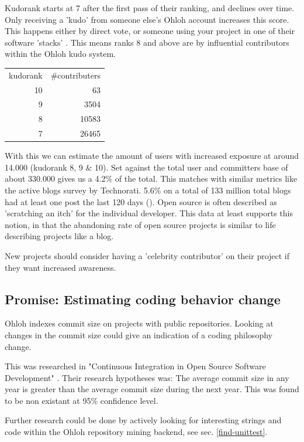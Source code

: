 \documentclass{sig-alternate}
\begin{document}
Kudorank starts at 7 after the first pass of their ranking, and declines over time. Only receiving a 'kudo' from someone else's Ohloh account increases this score. This happens either by direct vote, or someone using your project in one of their software 'stacks' \cite{ohloh-kudos}. This means ranks 8 and above are by influential contributors within the Ohloh kudo system.

\begin{tabular}{ r r }
  kudorank & \#contributers \\
  10 &    63 \\
  9  &  3504 \\
  8  & 10583 \\
  7  & 26465 \\
\end{tabular}

With this we can estimate the amount of users with increased exposure at around 14.000 (kudorank 8, 9 \& 10). Set against the total user and committers base of about 330.000 gives us a 4.2\% of the total. This matches with similar metrics like the active blogs survey by Technorati. 5.6\% on a total of 133 million total blogs had at least one post the last 120 days (\cite{blog-state-2008}). Open source is often described as 'scratching an itch' for the individual developer. This data at least supports this notion, in that the abandoning rate of open source projects is similar to life describing projects like a blog. 

New projects should consider having a 'celebrity contributor' on their project if they want increased awareness.

\subsection{Promise: Estimating coding behavior change}
Ohloh indexes commit size on projects with public repositories. Looking at changes in the commit size could give an indication of a coding philosophy change.

This was researched in "Continuous Integration in 
Open Source Software Development" \cite{Deshpande:2008p4463}. Their research hypotheses was: The average commit size in any year is greater than the average commit size during the next year. This was found to be non existant at 95\% confidence level.

Further research could be done by actively looking for interesting strings and code within the Ohloh repository mining backend, see sec. \ref{find-unittest}.
\end{document}
